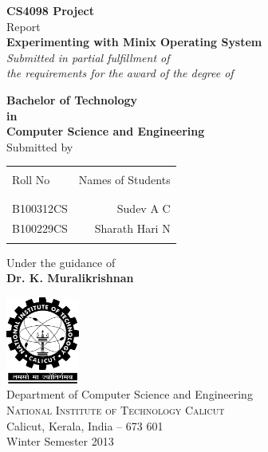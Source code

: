 \begin{titlepage}

\begin{center}

\textup{\small {\bf CS4098 Project} \\ Report}\\[0.2in]

\Large \textbf {Experimenting with Minix Operating System}\\[0.5in]

       \small \emph{Submitted in partial fulfillment of\\
        the requirements for the award of the degree of}
        \vspace{.2in}

       {\bf Bachelor of Technology \\in\\ Computer Science and Engineering}\\[0.5in]

\normalsize Submitted by \\
\begin{table}[h]
\centering
\begin{tabular}{lr}\hline \\
Roll No & Names of Students \\ \\ \hline
\\
B100312CS & Sudev A C \\
B100229CS & Sharath Hari N \\ 
 \\ \hline 
\end{tabular}
\end{table}

\vspace{.1in}
Under the guidance of\\
{\textbf{Dr. K. Muralikrishnan}}\\[0.2in]

\vfill

\includegraphics[width=0.18\textwidth]{./nitc-logo}\\[0.1in]
\Large{Department of Computer Science and Engineering}\\
\normalsize
\textsc{National Institute of Technology Calicut}\\
Calicut, Kerala, India -- 673 601 \\
\vspace{0.2cm}
Winter Semester 2013

\end{center}

\end{titlepage}

